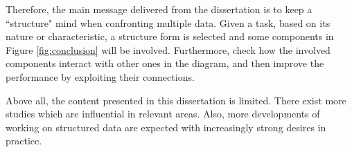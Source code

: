 Therefore, the main message delivered from the dissertation is to keep a ``structure" mind when confronting multiple data.       
Given a task, based on its nature or characteristic, a structure form is selected and some components in Figure \ref{fig:conclusion} will be involved. 
Furthermore, check how the involved components interact with other ones in the diagram, and then improve the performance by exploiting 
their connections. 

Above all, the content presented in this dissertation is limited. There exist more studies which are influential in relevant       
areas. Also, more developments of working on structured data are expected with increasingly strong desires in practice.        

